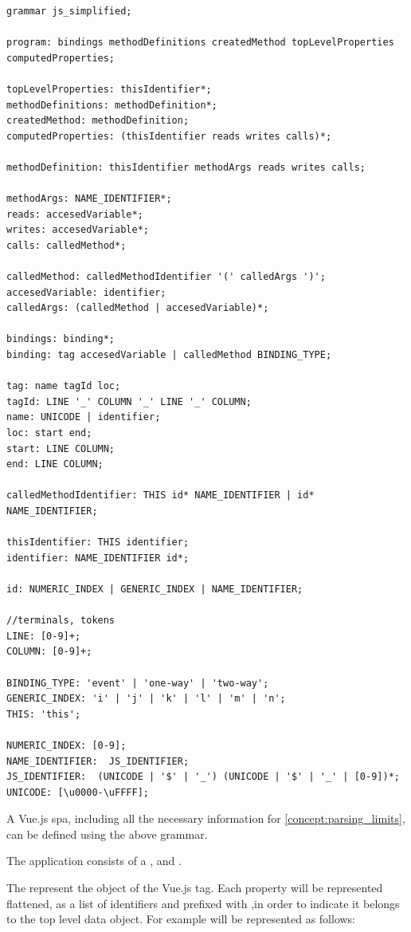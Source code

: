 \begin{lstlisting}[style=antrl]
grammar js_simplified;

program: bindings methodDefinitions createdMethod topLevelProperties computedProperties;

topLevelProperties: thisIdentifier*;
methodDefinitions: methodDefinition*; 
createdMethod: methodDefinition;
computedProperties: (thisIdentifier reads writes calls)*;

methodDefinition: thisIdentifier methodArgs reads writes calls;

methodArgs: NAME_IDENTIFIER*;
reads: accesedVariable*;
writes: accesedVariable*;
calls: calledMethod*;

calledMethod: calledMethodIdentifier '(' calledArgs ')';
accesedVariable: identifier;
calledArgs: (calledMethod | accesedVariable)*;

bindings: binding*;
binding: tag accesedVariable | calledMethod BINDING_TYPE;

tag: name tagId loc;
tagId: LINE '_' COLUMN '_' LINE '_' COLUMN;
name: UNICODE | identifier;
loc: start end;
start: LINE COLUMN;
end: LINE COLUMN;

calledMethodIdentifier: THIS id* NAME_IDENTIFIER | id* NAME_IDENTIFIER;

thisIdentifier: THIS identifier;
identifier: NAME_IDENTIFIER id*;
    
id: NUMERIC_INDEX | GENERIC_INDEX | NAME_IDENTIFIER;

//terminals, tokens
LINE: [0-9]+;
COLUMN: [0-9]+;

BINDING_TYPE: 'event' | 'one-way' | 'two-way';
GENERIC_INDEX: 'i' | 'j' | 'k' | 'l' | 'm' | 'n';
THIS: 'this';

NUMERIC_INDEX: [0-9];
NAME_IDENTIFIER:  JS_IDENTIFIER;
JS_IDENTIFIER:  (UNICODE | '$' | '_') (UNICODE | '$' | '_' | [0-9])*;
UNICODE: [\u0000-\uFFFF];
\end{lstlisting}
\label{ast}

A Vue.js \gls{spa}, including all the necessary information for \ref{concept:parsing_limits}, can be defined using the above grammar. 

The application consists of   a ,  and . 

The  represent the  object of the Vue.js  tag. Each property will be represented flattened, as a list of identifiers and prefixed with ,in order to indicate it belongs to the top level data object. For example  will be represented as follows:

